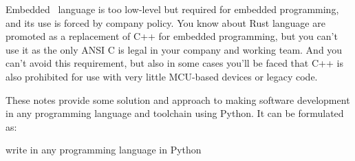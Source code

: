 
Embedded \emc\ language is too low-level but
required for embedded programming, and its use is forced by company policy. You
know about Rust language are promoted as a replacement of C++ for embedded
programming, but you can't use it as the only ANSI C is legal in your company
and working team. And you can't avoid this requirement, but also in some cases
you'll be faced that C++ is also prohibited for use with very little MCU-based
devices or legacy code.

These notes provide some solution and approach to making software development in
any programming language and toolchain using Python. It can be formulated as:
\begin{framed}\noindent\centering\Large
write in any programming language in Python
\end{framed}

